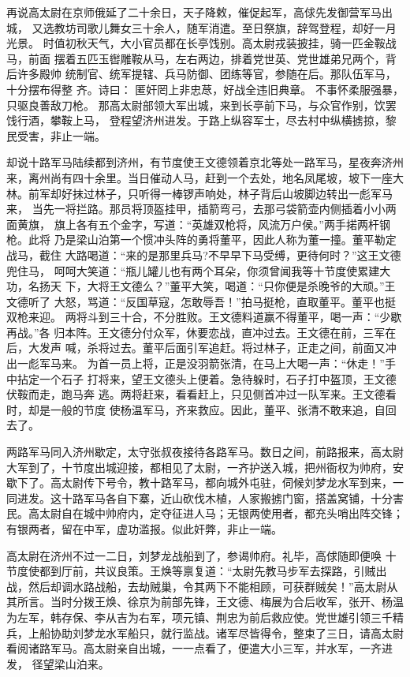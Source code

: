 再说高太尉在京师俄延了二十余日，天子降敕，催促起军，高俅先发御营军马出城，
又选教坊司歌儿舞女三十余人，随军消遣。至日祭旗，辞驾登程，却好一月光景。
时值初秋天气，大小官员都在长亭饯别。高太尉戎装披挂，骑一匹金鞍战马，前面
摆着五匹玉辔雕鞍从马，左右两边，排着党世英、党世雄弟兄两个，背后许多殿帅
统制官、统军提辖、兵马防御、团练等官，参随在后。那队伍军马，十分摆布得整
齐。诗曰：
匿奸罔上非忠荩，好战全违旧典章。
不事怀柔服强暴，只驱良善敌刀枪。
那高太尉部领大军出城，来到长亭前下马，与众官作别，饮罢饯行酒，攀鞍上马，
登程望济州进发。于路上纵容军士，尽去村中纵横掳掠，黎民受害，非止一端。

却说十路军马陆续都到济州，有节度使王文德领着京北等处一路军马，星夜奔济州
来，离州尚有四十余里。当日催动人马，赶到一个去处，地名凤尾坡，坡下一座大
林。前军却好抹过林子，只听得一棒锣声响处，林子背后山坡脚边转出一彪军马来，
当先一将拦路。那员将顶盔挂甲，插箭弯弓，去那弓袋箭壶内侧插着小小两面黄旗，
旗上各有五个金字，写道：“英雄双枪将，风流万户侯。”两手掿两杆钢枪。此将
乃是梁山泊第一个惯冲头阵的勇将董平，因此人称为董一撞。董平勒定战马，截住
大路喝道：“来的是那里兵马?不早早下马受缚，更待何时？”这王文德兜住马，
呵呵大笑道：“瓶儿罐儿也有两个耳朵，你须曾闻我等十节度使累建大功，名扬天
下，大将王文德么？”董平大笑，喝道：“只你便是杀晚爷的大顽。”王文德听了
大怒，骂道：“反国草寇，怎敢辱吾！”拍马挺枪，直取董平。董平也挺双枪来迎。
两将斗到三十合，不分胜败。王文德料道赢不得董平，喝一声：“少歇再战。”各
归本阵。王文德分付众军，休要恋战，直冲过去。王文德在前，三军在后，大发声
喊，杀将过去。董平后面引军追赶。将过林子，正走之间，前面又冲出一彪军马来。
为首一员上将，正是没羽箭张清，在马上大喝一声：“休走！”手中拈定一个石子
打将来，望王文德头上便着。急待躲时，石子打中盔顶，王文德伏鞍而走，跑马奔
逃。两将赶来，看看赶上，只见侧首冲过一队军来。王文德看时，却是一般的节度
使杨温军马，齐来救应。因此，董平、张清不敢来追，自回去了。

两路军马同入济州歇定，太守张叔夜接待各路军马。数日之间，前路报来，高太尉
大军到了，十节度出城迎接，都相见了太尉，一齐护送入城，把州衙权为帅府，安
歇下了。高太尉传下号令，教十路军马，都向城外屯驻，伺候刘梦龙水军到来，一
同进发。这十路军马各自下寨，近山砍伐木植，人家搬掳门窗，搭盖窝铺，十分害
民。高太尉自在城中帅府内，定夺征进人马；无银两使用者，都充头哨出阵交锋；
有银两者，留在中军，虚功滥报。似此奸弊，非止一端。

高太尉在济州不过一二日，刘梦龙战船到了，参谒帅府。礼毕，高俅随即便唤
十节度使都到厅前，共议良策。王焕等禀复道：“太尉先教马步军去探路，引贼出
战，然后却调水路战船，去劫贼巢，令其两下不能相顾，可获群贼矣！”高太尉从
其所言。当时分拨王焕、徐京为前部先锋，王文德、梅展为合后收军，张开、杨温
为左军，韩存保、李从吉为右军，项元镇、荆忠为前后救应使。党世雄引领三千精
兵，上船协助刘梦龙水军船只，就行监战。诸军尽皆得令，整束了三日，请高太尉
看阅诸路军马。高太尉亲自出城，一一点看了，便遣大小三军，并水军，一齐进发，
径望梁山泊来。

